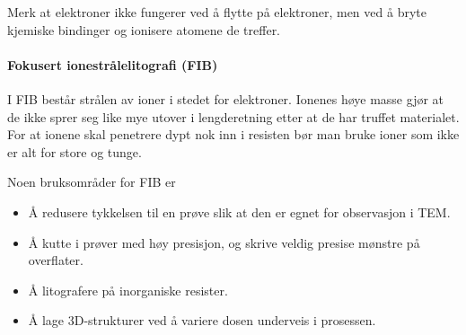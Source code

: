 Merk at elektroner ikke fungerer ved å flytte på elektroner, men ved å bryte kjemiske bindinger og ionisere atomene de treffer. 


\paragraph{Fokusert ionestrålelitografi (FIB)} I FIB består strålen av ioner i stedet for elektroner. Ionenes høye masse gjør at de ikke sprer seg like mye utover i lengderetning etter at de har truffet materialet. For at ionene skal penetrere dypt nok inn i resisten bør man bruke ioner som ikke er alt for store og tunge.

Noen bruksområder for FIB er
\begin{itemize}
	\item Å redusere tykkelsen til en prøve slik at den er egnet for observasjon i TEM.
	\item Å kutte i prøver med høy presisjon, og skrive veldig presise mønstre på overflater.
	\item Å litografere på inorganiske resister.
	\item Å lage 3D-strukturer ved å variere dosen underveis i prosessen.
\end{itemize}

